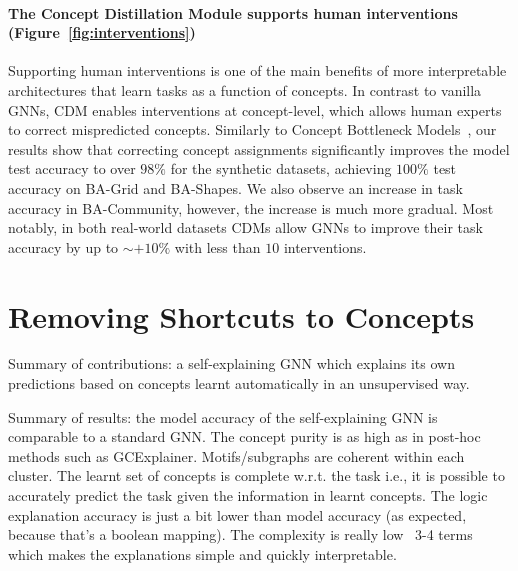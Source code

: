 \paragraph{The Concept Distillation Module supports human interventions (Figure~\ref{fig:interventions})}
Supporting human interventions is one of the main benefits of more interpretable architectures that learn tasks as a function of concepts. In contrast to vanilla GNNs, CDM enables interventions at concept-level, which allows human experts to correct mispredicted concepts. Similarly to Concept Bottleneck Models~\citep{koh2020concept}, our results show that correcting concept assignments significantly improves the model test accuracy to over $98\%$ for the synthetic datasets, achieving $100\%$ test accuracy on BA-Grid and BA-Shapes. We also observe an increase in task accuracy in BA-Community, however, the increase is much more gradual. Most notably, in both real-world datasets CDMs allow GNNs to improve their task accuracy by up to $\sim + 10\%$ with less than $10$ interventions.




\section{Removing Shortcuts to Concepts}


Summary of contributions: a self-explaining GNN which explains its own predictions based on concepts learnt automatically in an unsupervised way.

Summary of results: the model accuracy of the self-explaining GNN is comparable to a standard GNN. The concept purity is as high as in post-hoc methods such as GCExplainer. Motifs/subgraphs are coherent within each cluster. The learnt set of concepts is complete w.r.t. the task i.e., it is possible to accurately predict the task given the information in learnt concepts. The logic explanation accuracy is just a bit lower than model accuracy (as expected, because that's a boolean mapping). The complexity is really low ~3-4 terms which makes the explanations simple and quickly interpretable.

